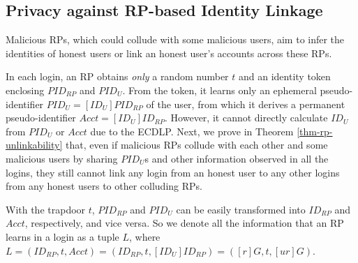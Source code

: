 \subsection{Privacy against RP-based Identity Linkage}
\label{subsec:RP-privacy}

Malicious RPs,
which could collude with some malicious users,
aim to infer the identities of honest users
    or link an honest user's accounts across these RPs.


In each login, an RP obtains \emph{only} a random number $t$ and an identity token enclosing $PID_{RP}$ and $PID_U$. From the token, it learns only an ephemeral pseudo-identifier $PID_{U} = [{ID_U}]{PID_{RP}}$ of the user, from which it derives a permanent pseudo-identifier $Acct = [ID_U]ID_{RP}$. However, it cannot directly calculate $ID_U$ from $PID_{U}$ or $Acct$ due to the ECDLP.
Next, we prove in Theorem \ref{thm-rp-unlinkability} that, even if malicious RPs collude with each other and some malicious users by sharing $PID_U$s and other information observed in all the logins, they still cannot link any login from an honest user to any other logins from any honest users to other colluding RPs.




With the trapdoor $t$, $PID_{RP}$ and $PID_U$ can be easily transformed into $ID_{RP}$ and $Acct$, respectively, and vice versa.
So we denote all the information that an RP learns in a login as a tuple $L$, where $L =(ID_{RP}, t, Acct)=(ID_{RP}, t, [ID_{U}]ID_{RP})=([r]G, t, [ur]G)$.


